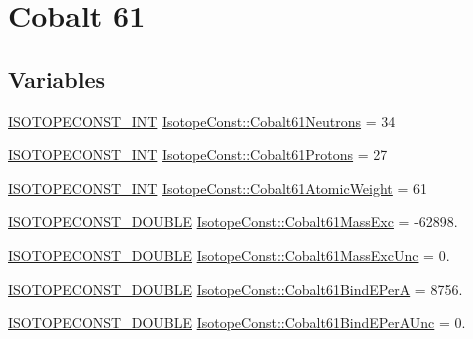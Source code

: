 \hypertarget{group___isotope_const-_cobalt-_co61}{}\section{Cobalt 61}
\label{group___isotope_const-_cobalt-_co61}
\subsection*{Variables}
\begin{DoxyCompactItemize}
\item 
\mbox{\hyperlink{group___isotope_const-_macros_ga5f18360b3e99483a35c32d789e62621c}{I\+S\+O\+T\+O\+P\+E\+C\+O\+N\+S\+T\+\_\+\+I\+NT}} \mbox{\hyperlink{group___isotope_const-_cobalt-_co61_gaad133e438453972046a688648b4519af}{Isotope\+Const\+::\+Cobalt61\+Neutrons}} = 34
\item 
\mbox{\hyperlink{group___isotope_const-_macros_ga5f18360b3e99483a35c32d789e62621c}{I\+S\+O\+T\+O\+P\+E\+C\+O\+N\+S\+T\+\_\+\+I\+NT}} \mbox{\hyperlink{group___isotope_const-_cobalt-_co61_gaeb03e75c0831f9013d77bb9169eea647}{Isotope\+Const\+::\+Cobalt61\+Protons}} = 27
\item 
\mbox{\hyperlink{group___isotope_const-_macros_ga5f18360b3e99483a35c32d789e62621c}{I\+S\+O\+T\+O\+P\+E\+C\+O\+N\+S\+T\+\_\+\+I\+NT}} \mbox{\hyperlink{group___isotope_const-_cobalt-_co61_gab6aa47a6d3186bc68914e1343ccdcbd3}{Isotope\+Const\+::\+Cobalt61\+Atomic\+Weight}} = 61
\item 
\mbox{\hyperlink{group___isotope_const-_macros_ga8f45a7272ce02c0b4c65c44636ed719a}{I\+S\+O\+T\+O\+P\+E\+C\+O\+N\+S\+T\+\_\+\+D\+O\+U\+B\+LE}} \mbox{\hyperlink{group___isotope_const-_cobalt-_co61_gaedb8ab49a7afa9af44a1c017f12ac430}{Isotope\+Const\+::\+Cobalt61\+Mass\+Exc}} = -\/62898.
\item 
\mbox{\hyperlink{group___isotope_const-_macros_ga8f45a7272ce02c0b4c65c44636ed719a}{I\+S\+O\+T\+O\+P\+E\+C\+O\+N\+S\+T\+\_\+\+D\+O\+U\+B\+LE}} \mbox{\hyperlink{group___isotope_const-_cobalt-_co61_ga9bcf3340da933e180e0a14a8445b5de6}{Isotope\+Const\+::\+Cobalt61\+Mass\+Exc\+Unc}} = 0.
\item 
\mbox{\hyperlink{group___isotope_const-_macros_ga8f45a7272ce02c0b4c65c44636ed719a}{I\+S\+O\+T\+O\+P\+E\+C\+O\+N\+S\+T\+\_\+\+D\+O\+U\+B\+LE}} \mbox{\hyperlink{group___isotope_const-_cobalt-_co61_ga3e3b5e2727b54dd3560ad03d673a5c10}{Isotope\+Const\+::\+Cobalt61\+Bind\+E\+PerA}} = 8756.
\item 
\mbox{\hyperlink{group___isotope_const-_macros_ga8f45a7272ce02c0b4c65c44636ed719a}{I\+S\+O\+T\+O\+P\+E\+C\+O\+N\+S\+T\+\_\+\+D\+O\+U\+B\+LE}} \mbox{\hyperlink{group___isotope_const-_cobalt-_co61_gadf5b085a6c9dcc03bc1efaf4da841a7e}{Isotope\+Const\+::\+Cobalt61\+Bind\+E\+Per\+A\+Unc}} = 0.

\end{DoxyCompactItemize}
